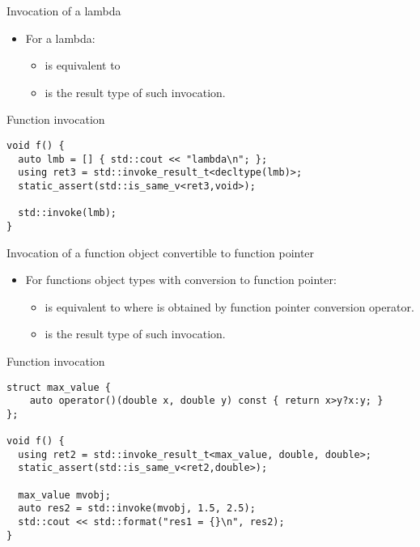 \begin{frame}[t,fragile]{Invocation of a lambda}
\begin{itemize}
  \item For a lambda:
    \begin{itemize}
      \item {}
            is equivalent to 
      \item {}
            is the result type of such invocation.
    \end{itemize}
\end{itemize}
\begin{block}{Function invocation}
\begin{lstlisting}
void f() {
  auto lmb = [] { std::cout << "lambda\n"; };
  using ret3 = std::invoke_result_t<decltype(lmb)>;
  static_assert(std::is_same_v<ret3,void>);

  std::invoke(lmb);
}
\end{lstlisting}
\end{block}
\end{frame}

\begin{frame}[t,fragile]{Invocation of a function object convertible to function pointer}
\begin{itemize}
  \item For functions object types with conversion to function pointer:
    \begin{itemize}
      \item {}
            is equivalent to 
             where
             is obtained by function pointer conversion operator.
      \item {}
            is the result type of such invocation.
    \end{itemize}
\end{itemize}
\begin{block}{Function invocation}
\begin{lstlisting}[basicstyle=\tiny]
struct max_value {
    auto operator()(double x, double y) const { return x>y?x:y; }
};

void f() {
  using ret2 = std::invoke_result_t<max_value, double, double>;
  static_assert(std::is_same_v<ret2,double>);

  max_value mvobj;
  auto res2 = std::invoke(mvobj, 1.5, 2.5);
  std::cout << std::format("res1 = {}\n", res2);
}
\end{lstlisting}
\end{block}
\end{frame}

